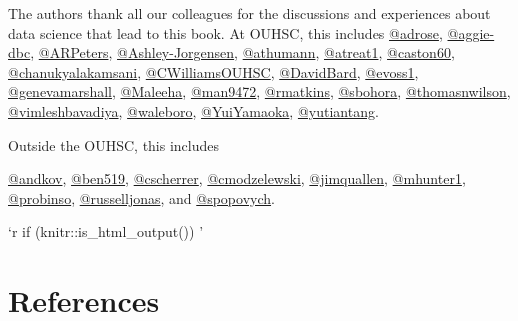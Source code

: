\documentclass[
]{book}
\begin{document}
The authors thank all our colleagues for the discussions and experiences about data science that lead to this book. At OUHSC, this includes
\href{https://github.com/adrose}{@adrose},
\href{https://github.com/aggie-dbc}{@aggie-dbc},
\href{https://github.com/ARPeters}{@ARPeters},
\href{https://github.com/Ashley-Jorgensen}{@Ashley-Jorgensen},
\href{https://github.com/athumann}{@athumann},
\href{https://github.com/atreat1}{@atreat1},
\href{https://github.com/caston60}{@caston60},
\href{https://github.com/chanukyalakamsani}{@chanukyalakamsani},
\href{https://github.com/CWilliamsOUHSC}{@CWilliamsOUHSC},
\href{https://github.com/DavidBard}{@DavidBard},
\href{https://github.com/evoss1}{@evoss1},
\href{https://github.com/genevamarshall}{@genevamarshall},
\href{https://github.com/Maleeha}{@Maleeha},
\href{https://github.com/man9472}{@man9472},
\href{https://github.com/rmatkins}{@rmatkins},
\href{https://github.com/sbohora}{@sbohora},
\href{https://github.com/thomasnwilson}{@thomasnwilson},
\href{https://github.com/vimleshbavadiya}{@vimleshbavadiya},
\href{https://github.com/waleboro}{@waleboro},
\href{https://github.com/YuiYamaoka}{@YuiYamaoka},
\href{https://github.com/yutiantang}{@yutiantang}.

Outside the OUHSC, this includes

\href{https://github.com/andkov}{@andkov},
\href{https://github.com/ben519}{@ben519},
\href{https://github.com/cscherrer}{@cscherrer},
\href{https://github.com/cmodzelewski}{@cmodzelewski},
\href{https://github.com/jimquallen}{@jimquallen},
\href{https://github.com/mhunter1}{@mhunter1},
\href{https://github.com/probinso}{@probinso},
\href{https://github.com/russelljonas}{@russelljonas}, and
\href{https://github.com/spopovych}{@spopovych}.

`r if (knitr::is\_html\_output()) '

\hypertarget{references}{%
\chapter{References}\label{references}}

  
\end{document}
